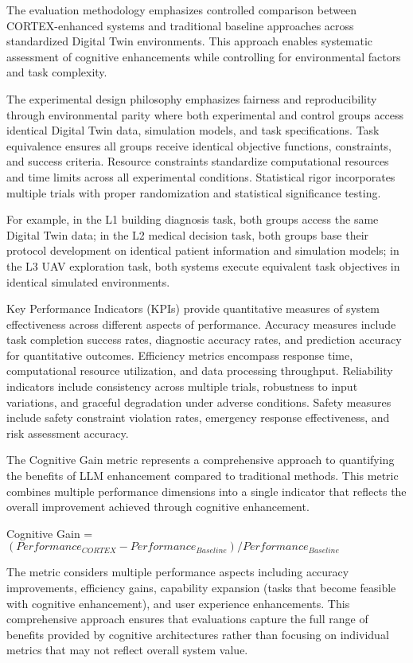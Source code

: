 The evaluation methodology emphasizes controlled comparison between CORTEX-enhanced systems and traditional baseline approaches across standardized Digital Twin environments. This approach enables systematic assessment of cognitive enhancements while controlling for environmental factors and task complexity.

The experimental design philosophy emphasizes fairness and reproducibility through environmental parity where both experimental and control groups access identical Digital Twin data, simulation models, and task specifications. Task equivalence ensures all groups receive identical objective functions, constraints, and success criteria. Resource constraints standardize computational resources and time limits across all experimental conditions. Statistical rigor incorporates multiple trials with proper randomization and statistical significance testing.

For example, in the L1 building diagnosis task, both groups access the same Digital Twin data; in the L2 medical decision task, both groups base their protocol development on identical patient information and simulation models; in the L3 UAV exploration task, both systems execute equivalent task objectives in identical simulated environments.

Key Performance Indicators (KPIs) provide quantitative measures of system effectiveness across different aspects of performance. Accuracy measures include task completion success rates, diagnostic accuracy rates, and prediction accuracy for quantitative outcomes. Efficiency metrics encompass response time, computational resource utilization, and data processing throughput. Reliability indicators include consistency across multiple trials, robustness to input variations, and graceful degradation under adverse conditions. Safety measures include safety constraint violation rates, emergency response effectiveness, and risk assessment accuracy.

The Cognitive Gain metric represents a comprehensive approach to quantifying the benefits of LLM enhancement compared to traditional methods. This metric combines multiple performance dimensions into a single indicator that reflects the overall improvement achieved through cognitive enhancement.

Cognitive Gain = $(Performance_{CORTEX} - Performance_{Baseline}) / Performance_{Baseline}$

The metric considers multiple performance aspects including accuracy improvements, efficiency gains, capability expansion (tasks that become feasible with cognitive enhancement), and user experience enhancements. This comprehensive approach ensures that evaluations capture the full range of benefits provided by cognitive architectures rather than focusing on individual metrics that may not reflect overall system value.

